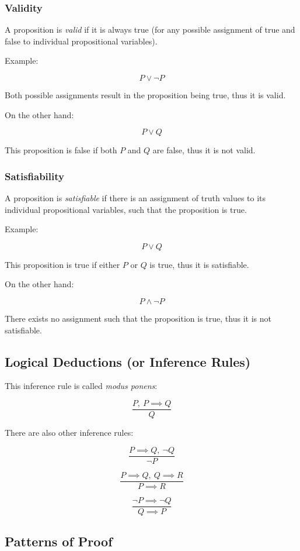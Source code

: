 \documentclass[../main.tex]{subfiles}
\begin{document}
\subsubsection{Validity}

A proposition is \textit{valid} if it is always true (for any possible assignment of true and false to individual propositional variables).

Example:

$$
P \lor \neg P
$$

Both possible assignments result in the proposition being true, thus it is valid.

On the other hand:

$$
P \lor Q
$$

This proposition is false if both $P$ and $Q$ are false, thus it is not valid.

\subsubsection{Satisfiability}

A proposition is \textit{satisfiable} if there is an assignment of truth values to its individual propositional variables, such that the proposition is true.

Example:

$$
P \lor Q
$$

This proposition is true if either $P$ or $Q$ is true, thus it is satisfiable.

On the other hand:

$$
P \land \neg P
$$

There exists no assignment such that the proposition is true, thus it is not satisfiable.

\subsection{Logical Deductions (or Inference Rules)}

This inference rule is called \textit{modus ponens}:

$$
\frac{P,\ P \implies Q}{Q}
$$

There are also other inference rules:

$$
\frac{P \implies Q,\ \neg Q}{\neg P}
$$

$$
\frac
{P \implies Q,\ Q \implies R}
{P \implies R}
$$

$$
\frac{\neg P \implies \neg Q}{Q \implies P}
$$

\subsection{Patterns of Proof}
\end{document}
